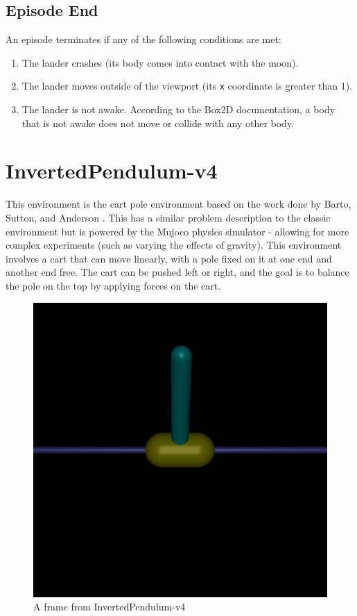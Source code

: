 \documentclass{article} %
\begin{document}
\subsection{Episode End}
An episode terminates if any of the following conditions are met: \begin{enumerate} \item The lander crashes (its body comes into contact with the moon). \item The lander moves outside of the viewport (its \verb|x| coordinate is greater than 1). \item The lander is not awake. According to the Box2D documentation, a body that is not awake does not move or collide with any other body. \end{enumerate}

\section{InvertedPendulum-v4}

This environment is the cart pole environment based on the work done by Barto, Sutton, and Anderson \cite{barto1983neuronlike}. This has a similar problem description to the classic environment but is powered by the Mujoco physics simulator - allowing for more complex experiments (such as varying the effects of gravity). This environment involves a cart that can move linearly, with a pole fixed on it at one end and another end free. The cart can be pushed left or right, and the goal is to balance the pole on the top by applying forces on the cart.

\begin{figure}[h]
    \begin{center}
        \includegraphics[width=\textwidth]{inverted_pendulum.png}
    \end{center}
    \caption{A frame from InvertedPendulum-v4}
    \label{fig:invpendulum-rendering}
\end{figure}
\end{document}
